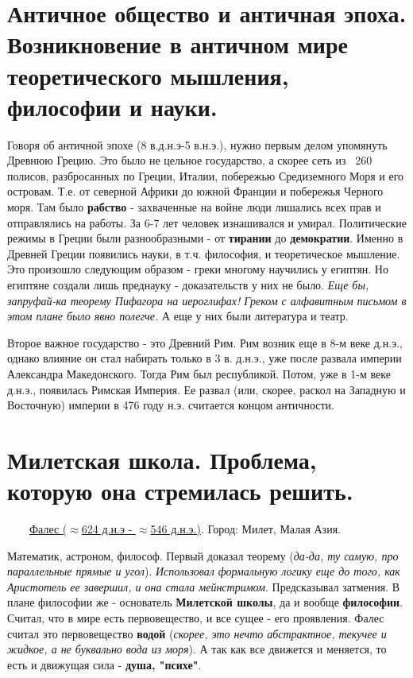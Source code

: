 \section{Античное общество и античная эпоха. Возникновение в античном мире теоретического мышления, философии и науки.}
Говоря об античной эпохе (8 в.д.н.э-5 в.н.э.), нужно первым делом упомянуть Древнюю Грецию. Это было не цельное государство, а скорее сеть из ~260 полисов, разбросанных по Греции, Италии, побережью Средиземного Моря и его островам. Т.е. от северной Африки до южной Франции и побережья Черного моря. Там было \textbf{рабство} - захваченные на войне люди лишались всех прав и отправлялись на работы. За 6-7 лет человек изнашивался и умирал.  Политические режимы в Греции были разнообразными - от \textbf{тирании} до \textbf{демократии}. Именно в Древней Греции появились науки, в т.ч. философия, и теоретическое мышление. Это произошло следующим образом - греки многому научились у египтян. Но египтяне создали лишь преднауку  - доказательств у них не было. \textit{Еще бы, запруфай-ка теорему Пифагора на иероглифах! Греком с алфавитным письмом  в этом плане было явно полегче.} А еще у них были литература и театр.

Второе важное государство - это Древний Рим. Рим возник еще в 8-м веке д.н.э., однако влияние он стал набирать только в 3 в. д.н.э., уже после развала империи Александра Македонского. Тогда Рим был республикой. Потом, уже в 1-м веке д.н.э., появилась Римская Империя. Ее развал (или, скорее, раскол на Западную и Восточную) империи в 476 году н.э. считается концом античности.

\section{Милетская школа. Проблема, которую она стремилась решить.}
\ \ \ \
\underline{Фалес ($\approx$624 д.н.э - $\approx$546 д.н.э.)}. Город: Милет, Малая Азия.

Математик, астроном, философ. Первый доказал теорему (\textit{да-да, ту самую, про параллельные прямые и угол}). \textit{Использовал формальную логику еще до того, как Аристотель ее завершил, и она стала мейнстримом}. Предсказывал затмения. В плане философии же - основатель \textbf{Милетской школы}, да и вообще \textbf{философии}. Считал, что в мире есть первовещество, и все сущее - его проявления. Фалес считал это первовещество \textbf{водой} (\textit{скорее, это нечто абстрактное, текучее и жидкое, а не буквально вода из моря}). А так как все движется и меняется, то есть и движущая сила - \textbf{душа, "психе"}.

